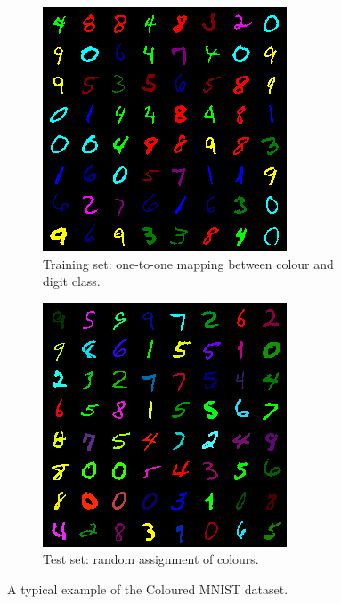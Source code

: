 \begin{figure}[tp]
  \centering
  \begin{subfigure}[b]{0.4\textwidth}
    \centering
    \includegraphics[width=\textwidth]{figures/cmnist-train.png}
    \caption{Training set: one-to-one mapping between colour and digit class.}%
    \label{fig:literature-cmnist-train}
  \end{subfigure}
  \quad\quad
  \begin{subfigure}[b]{0.4\textwidth}
    \centering
    \includegraphics[width=\textwidth]{figures/cmnist-test.png}
    \caption{Test set: random assignment of colours.}%
    \label{fig:literature-cmnist-test}
  \end{subfigure}
  \caption{%
    A typical example of the Coloured MNIST dataset.
  }%
  \label{fig:literature-cmnist}
\end{figure}

